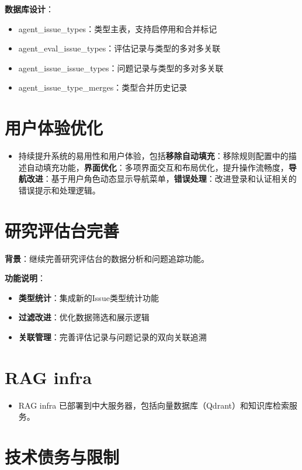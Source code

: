 \documentclass[UTF8]{ctexart}
\begin{document}
\textbf{数据库设计}：
\begin{itemize}
\item agent\_issue\_types：类型主表，支持启停用和合并标记
\item agent\_eval\_issue\_types：评估记录与类型的多对多关联
\item agent\_issue\_issue\_types：问题记录与类型的多对多关联
\item agent\_issue\_type\_merges：类型合并历史记录
\end{itemize}

\section{用户体验优化}

\begin{itemize}
\item 持续提升系统的易用性和用户体验，包括\textbf{移除自动填充}：移除规则配置中的描述自动填充功能，\textbf{界面优化}：多项界面交互和布局优化，提升操作流畅度，\textbf{导航改进}：基于用户角色动态显示导航菜单，\textbf{错误处理}：改进登录和认证相关的错误提示和处理逻辑。
\end{itemize}

\section{研究评估台完善}

\textbf{背景}：继续完善研究评估台的数据分析和问题追踪功能。

\textbf{功能说明}：
\begin{itemize}
\item \textbf{类型统计}：集成新的Issue类型统计功能
\item \textbf{过滤改进}：优化数据筛选和展示逻辑
\item \textbf{关联管理}：完善评估记录与问题记录的双向关联追溯
\end{itemize}

\section{RAG infra}

\begin{itemize}
\item RAG infra 已部署到中大服务器，包括向量数据库（Qdrant）和知识库检索服务。
\end{itemize}

\section{技术债务与限制}
\end{document}
